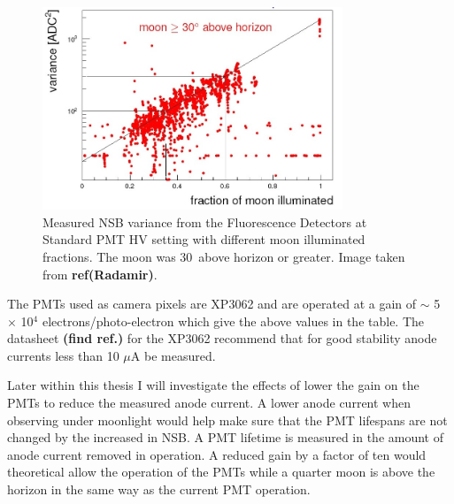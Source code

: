 \begin{figure}
\centering
\includegraphics[width=0.8\textwidth]{chapters/pix/SelEff/BGLoop_Variance_crop.jpg}
\caption{Measured NSB variance from the Fluorescence Detectors at Standard PMT HV setting with different moon illuminated fractions. The moon was 30\textdegree \ above horizon or greater. Image taken from \textbf{ref(Radamir)}.}
\end{figure}

The PMTs used as camera pixels are XP3062 and are operated at a gain of $\sim$ 5 $\times$ 10$^4$ electrons/photo-electron which give the above values in the table. The datasheet \textbf{(find ref.)} for the XP3062 recommend that for good stability anode currents less than 10 $\mu$A be measured. 
  
Later within this thesis I will investigate the effects of lower the gain on the PMTs to reduce the measured anode current. A lower anode current when observing under moonlight would help make sure that the PMT lifespans are not changed by the increased in NSB. A PMT lifetime is measured in the amount of anode current removed in operation. A reduced gain by a factor of ten would theoretical allow the operation of the PMTs while a quarter moon is above the horizon in the same way as the current PMT operation.  

